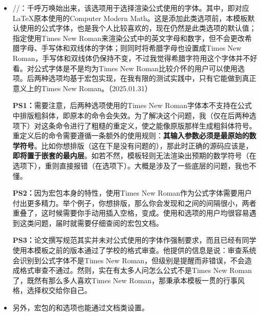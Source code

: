 \documentclass[print, doctor, vlined]{DissertUESTC}
\begin{document}
\begin{itemize}
\begin{itemize}
			\item {}//：千呼万唤始出来，该选项用于选择渲染公式使用的字体。其中，即对应LaTeX原本使用的Computer Modern Math。这是添加此类选项前，本模板默认使用的公式字体，也是我个人比较喜欢的，现在仍然是此类选项的默认值；指定使用Times New Roman来渲染公式中的英文字母和数字，但不会更改希腊字母、手写体和双线体的字体；则同时将希腊字母也设置成Times New Roman，手写体和双线体仍保持不变，不过我觉得希腊字符用这个字体并不好看。对公式字体是不是均为Times New Roman比较介怀的用户可以使用选项。后两种选项均基于\href{https://mirrors.nju.edu.cn/CTAN/macros/xetex/latex/mathspec/mathspec.pdf}{}宏包实现，在我有限的测试实践中，只有它能做到真正意义上的Times New Roman。（2025.01.31）
			
			\textbf{PS1：}需要注意，后两种选项使用的Times New Roman字体本不支持在公式中排版粗斜体，即原本的命令会失效。为了解决这个问题，我（仅在后两种选项下）对这条命令进行了粗糙的重定义，使之能像原版那样生成粗斜体符号。重定义后的命令需要遵循一条额外的使用规则：\textbf{其输入参数必须是最原始的数学符号}。比如你想排版（这在下是没有问题的），那此时正确的源码应该是，\textbf{即将置于嵌套的最内层}。如若不然，模板轻则无法渲染出预期的数学符号（在选项下），重则直接报错（在选项下）。大概是涉及了一些底层的问题，我也不懂。

			\textbf{PS2：}因为\href{https://mirrors.nju.edu.cn/CTAN/macros/xetex/latex/mathspec/mathspec.pdf}{}宏包本身的特性，使用Times New Roman作为公式字体需要用户付出更多精力。举个例子，你想排版，那么你会发现和之间的间隔很小，两者重叠了，这时候需要你手动用插入空格，变成。使用和选项的用户均很容易遇到这类问题，届时就需要仔细查阅\href{https://mirrors.nju.edu.cn/CTAN/macros/xetex/latex/mathspec/mathspec.pdf}{}的宏包文档。

			\textbf{PS3：}论文撰写规范其实并未对公式使用的字体作强制要求，而且已经有同学使用本模板之前的版本通过了学校的格式审查。他提供的信息是说：审查系统会识别到公式字体不是Times New Roman，但级别是提醒而非错误，不会造成格式审查不通过。然则，实在有太多人问怎么公式不是Times New Roman了，既然有那么多人喜欢Times New Roman，那秉承本模板一贯的行事风格，选择权交给你自己。

			\item 另外，\href{https://mirrors.sustech.edu.cn/CTAN/macros/latex/contrib/algorithm2e/doc/algorithm2e.pdf}{}宏包的和选项也能通过文档类设置。
		\end{itemize}
	\end{itemize}
	
\end{document}
